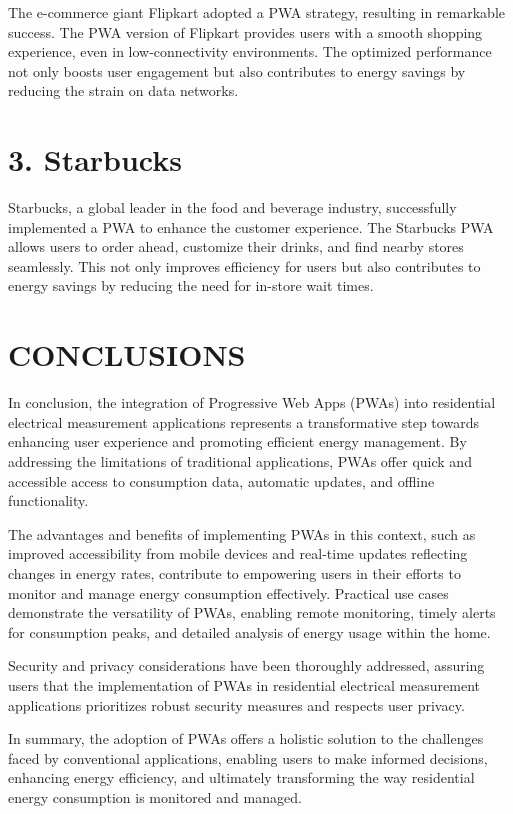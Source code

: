 \documentclass{article}
\begin{document}
\begin{multicols}{2}
The e-commerce giant Flipkart adopted a PWA strategy, resulting in remarkable success. The PWA version of Flipkart provides users with a smooth shopping experience, even in low-connectivity environments. The optimized performance not only boosts user engagement but also contributes to energy savings by reducing the strain on data networks.
\citep*{PWAcaring}
\section*{3. Starbucks}

Starbucks, a global leader in the food and beverage industry, successfully implemented a PWA to enhance the customer experience. The Starbucks PWA allows users to order ahead, customize their drinks, and find nearby stores seamlessly. This not only improves efficiency for users but also contributes to energy savings by reducing the need for in-store wait times.
\citep{StarbucksPWA}


\section*{CONCLUSIONS}
In conclusion, the integration of Progressive Web Apps (PWAs) into residential electrical measurement applications represents a transformative step towards enhancing user experience and promoting efficient energy management. By addressing the limitations of traditional applications, PWAs offer quick and accessible access to consumption data, automatic updates, and offline functionality.



The advantages and benefits of implementing PWAs in this context, such as improved accessibility from mobile devices and real-time updates reflecting changes in energy rates, contribute to empowering users in their efforts to monitor and manage energy consumption effectively. Practical use cases demonstrate the versatility of PWAs, enabling remote monitoring, timely alerts for consumption peaks, and detailed analysis of energy usage within the home.



Security and privacy considerations have been thoroughly addressed, assuring users that the implementation of PWAs in residential electrical measurement applications prioritizes robust security measures and respects user privacy.



In summary, the adoption of PWAs offers a holistic solution to the challenges faced by conventional applications, enabling users to make informed decisions, enhancing energy efficiency, and ultimately transforming the way residential energy consumption is monitored and managed.

   
     
\end{multicols}  %
\end{document}
